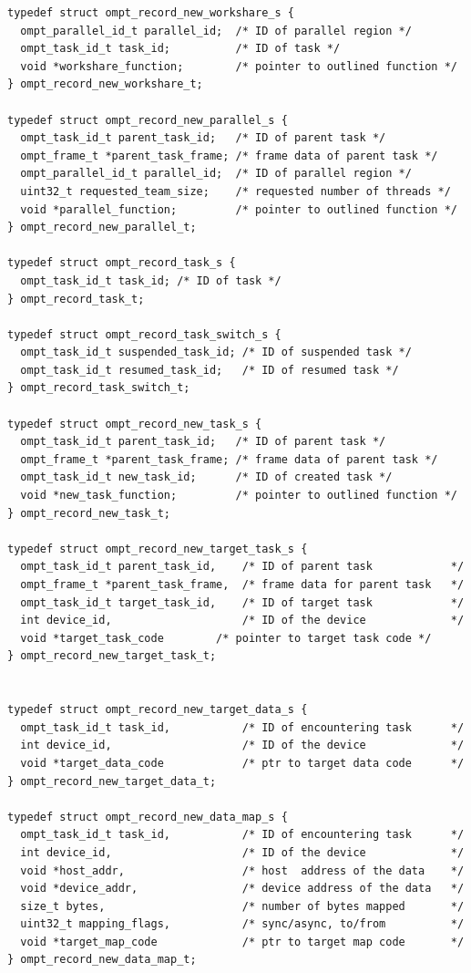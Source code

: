 \documentclass{article}
\begin{document}
{\begin{verbatim}
typedef struct ompt_record_new_workshare_s {
  ompt_parallel_id_t parallel_id;  /* ID of parallel region */
  ompt_task_id_t task_id;          /* ID of task */
  void *workshare_function;        /* pointer to outlined function */
} ompt_record_new_workshare_t;

typedef struct ompt_record_new_parallel_s {
  ompt_task_id_t parent_task_id;   /* ID of parent task */
  ompt_frame_t *parent_task_frame; /* frame data of parent task */
  ompt_parallel_id_t parallel_id;  /* ID of parallel region */
  uint32_t requested_team_size;    /* requested number of threads */
  void *parallel_function;         /* pointer to outlined function */
} ompt_record_new_parallel_t;

typedef struct ompt_record_task_s {
  ompt_task_id_t task_id; /* ID of task */
} ompt_record_task_t;

typedef struct ompt_record_task_switch_s {
  ompt_task_id_t suspended_task_id; /* ID of suspended task */
  ompt_task_id_t resumed_task_id;   /* ID of resumed task */
} ompt_record_task_switch_t;

typedef struct ompt_record_new_task_s {
  ompt_task_id_t parent_task_id;   /* ID of parent task */
  ompt_frame_t *parent_task_frame; /* frame data of parent task */
  ompt_task_id_t new_task_id;      /* ID of created task */
  void *new_task_function;         /* pointer to outlined function */
} ompt_record_new_task_t;

typedef struct ompt_record_new_target_task_s {
  ompt_task_id_t parent_task_id,    /* ID of parent task            */
  ompt_frame_t *parent_task_frame,  /* frame data for parent task   */
  ompt_task_id_t target_task_id,    /* ID of target task            */
  int device_id,                    /* ID of the device             */
  void *target_task_code        /* pointer to target task code */
} ompt_record_new_target_task_t;


typedef struct ompt_record_new_target_data_s {
  ompt_task_id_t task_id,           /* ID of encountering task      */
  int device_id,                    /* ID of the device             */
  void *target_data_code            /* ptr to target data code      */
} ompt_record_new_target_data_t;
 
typedef struct ompt_record_new_data_map_s {
  ompt_task_id_t task_id,           /* ID of encountering task      */
  int device_id,                    /* ID of the device             */
  void *host_addr,                  /* host  address of the data    */
  void *device_addr,                /* device address of the data   */ 
  size_t bytes,                     /* number of bytes mapped       */
  uint32_t mapping_flags,           /* sync/async, to/from          */
  void *target_map_code             /* ptr to target map code       */
} ompt_record_new_data_map_t;


\end{verbatim}}
\end{document}
